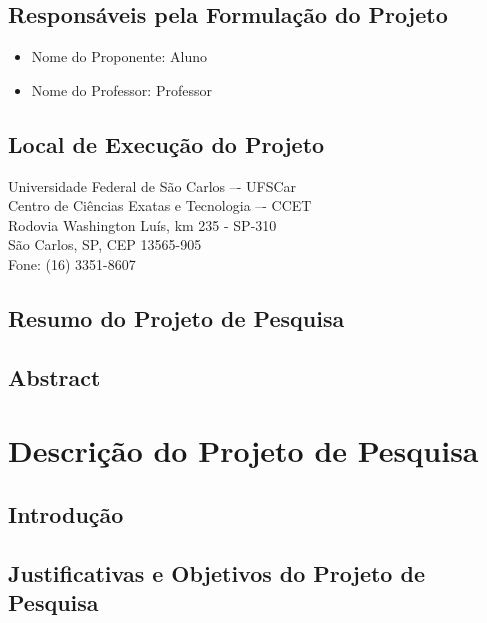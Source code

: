 \documentclass[projeto]{ufscar}
\begin{document}
\section{Responsáveis pela Formulação do Projeto}
\begin{itemize}
    \item Nome do Proponente: Aluno
    \item Nome do Professor: Professor
\end{itemize}

\section{Local de Execução do Projeto}

\indent Universidade Federal de São Carlos –- UFSCar\\ 
\indent Centro de Ciências Exatas e Tecnologia –- CCET\\


\indent Rodovia Washington Luís, km 235 - SP-310 \\
\indent São Carlos, SP, CEP 13565-905 \\
\indent Fone: (16) 3351-8607 

\section{Resumo do Projeto de Pesquisa}

\section{Abstract}

\chapter{Descrição do Projeto de Pesquisa}

\section{Introdução}

\cite{ibge1993}

\section{Justificativas e Objetivos do Projeto de Pesquisa}
\end{document}
